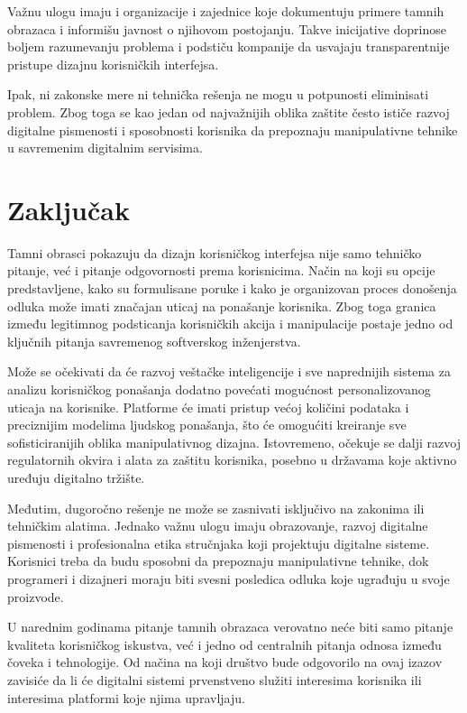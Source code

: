 \documentclass[12pt,a4paper]{article}
\begin{document}
Važnu ulogu imaju i organizacije i zajednice koje dokumentuju primere tamnih obrazaca i informišu javnost o njihovom postojanju. Takve inicijative doprinose boljem razumevanju problema i podstiču kompanije da usvajaju transparentnije pristupe dizajnu korisničkih interfejsa.

Ipak, ni zakonske mere ni tehnička rešenja ne mogu u potpunosti eliminisati problem. Zbog toga se kao jedan od najvažnijih oblika zaštite često ističe razvoj digitalne pismenosti i sposobnosti korisnika da prepoznaju manipulativne tehnike u savremenim digitalnim servisima.

\section{Zaključak}

Tamni obrasci pokazuju da dizajn korisničkog interfejsa nije samo tehničko pitanje, već i pitanje odgovornosti prema korisnicima. Način na koji su opcije predstavljene, kako su formulisane poruke i kako je organizovan proces donošenja odluka može imati značajan uticaj na ponašanje korisnika. Zbog toga granica između legitimnog podsticanja korisničkih akcija i manipulacije postaje jedno od ključnih pitanja savremenog softverskog inženjerstva.

Može se očekivati da će razvoj veštačke inteligencije i sve naprednijih sistema za analizu korisničkog ponašanja dodatno povećati mogućnost personalizovanog uticaja na korisnike. Platforme će imati pristup većoj količini podataka i preciznijim modelima ljudskog ponašanja, što će omogućiti kreiranje sve sofisticiranijih oblika manipulativnog dizajna. Istovremeno, očekuje se dalji razvoj regulatornih okvira i alata za zaštitu korisnika, posebno u državama koje aktivno uređuju digitalno tržište.

Međutim, dugoročno rešenje ne može se zasnivati isključivo na zakonima ili tehničkim alatima. Jednako važnu ulogu imaju obrazovanje, razvoj digitalne pismenosti i profesionalna etika stručnjaka koji projektuju digitalne sisteme. Korisnici treba da budu sposobni da prepoznaju manipulativne tehnike, dok programeri i dizajneri moraju biti svesni posledica odluka koje ugrađuju u svoje proizvode.

U narednim godinama pitanje tamnih obrazaca verovatno neće biti samo pitanje kvaliteta korisničkog iskustva, već i jedno od centralnih pitanja odnosa između čoveka i tehnologije. Od načina na koji društvo bude odgovorilo na ovaj izazov zavisiće da li će digitalni sistemi prvenstveno služiti interesima korisnika ili interesima platformi koje njima upravljaju.
\end{document}
